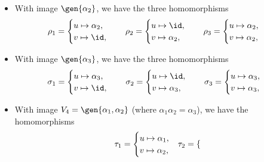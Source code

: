 \begin{solenum}
\begin{itemize}
\begin{itemize}
\[            \]
            \item With image $\gen{\alpha_2}$, we have the three homomorphisms
            \[
            	\rho_1 = 
                \begin{cases}
                    u \mapsto \alpha_2, \\
                    v \mapsto \id,
                \end{cases} \quad
                \rho_2 =
                \begin{cases}
                    u \mapsto \id, \\
                    v \mapsto \alpha_2,
                \end{cases} \quad
                \rho_3 =
                \begin{cases}
                    u \mapsto \alpha_2, \\
                    v \mapsto \alpha_2,
                \end{cases}
            \]
            \item With image $\gen{\alpha_3}$, we have the three homomorphisms
            \[
            	\sigma_1 = 
                \begin{cases}
                    u \mapsto \alpha_3, \\
                    v \mapsto \id,
                \end{cases} \quad
                \sigma_2 =
                \begin{cases}
                    u \mapsto \id, \\
                    v \mapsto \alpha_3,
                \end{cases} \quad
                \sigma_3 =
                \begin{cases}
                    u \mapsto \alpha_3, \\
                    v \mapsto \alpha_3,
                \end{cases}
            \]
            \item With image $V_4 = \gen{\alpha_1, \alpha_2}$ (where $\alpha_1\alpha_2 = \alpha_3$), we have the homomorphisms
            \[
            	\tau_1 = 
                \begin{cases}
                    u \mapsto \alpha_1, \\
                    v \mapsto \alpha_2,
                \end{cases} \hspace{-2pt}
                \tau_2 =
                \begin{cases}

\end{cases}\]
\end{itemize}
\end{itemize}
\end{solenum}
